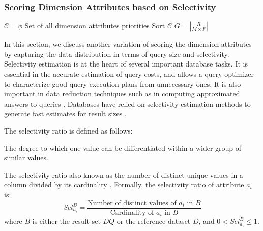 \subsubsection{Scoring Dimension Attributes based on Selectivity}
\label{sec:sela}
%
\begin{algorithm}[t]                      
\caption{$Sela$}          
\label{alg:sela}                           
$\mathcal{C} = \phi$ Set of all dimension attributes priorities \;
	 Sort $\mathcal{C}$\;
	$G= |\frac{R}{M \times F}|$ \;
		\;
\end{algorithm}
%
In this section, we discuss another variation of scoring the dimension attributes by capturing the data distribution in 
terms of query size and selectivity.
%
Selectivity estimation is at the heart of several important database tasks. 
%
It is essential in the accurate estimation of query costs, and allows a query optimizer to characterize good query execution plans from unnecessary ones. 
%
It is also important in data reduction techniques such as in computing approximated answers to queries \cite{DBLP:journals/debu/BarbaraDFHHIJJNPRS97,DBLP:conf/pods/GilbertKMS01}. 
%
Databases have relied on selectivity estimation methods to generate fast estimates for result sizes \cite{DBLP:conf/sigmod/ChaudhuriMN98,DBLP:conf/pods/CharikarCMN00,DBLP:journals/csur/ManninoCS88,DBLP:conf/sigmod/Piatetsky-ShapiroC84}.
%
%

The selectivity ratio \cite{lahdenmaki2005relational} is defined as follows:
\begin{definition}
The degree to which one value can be differentiated within a wider group of similar values.
\end{definition}
%
The selectivity ratio also known as the number of distinct unique 
values in a column divided by its cardinality \cite{DBLP:conf/sigmod/KeyHPA12}.
%
Formally, the selectivity ratio of attribute $a_i$ is:
%
\begin{equation}
\label{eq:selec_ratio}
Sel_{a_i}^{B} = \frac{ \text{Number of distinct values of $a_i$ in $B$} }{ \text{Cardinality of $a_i$ in $B$} }
\end{equation}
%
where $B$ is either the result set $DQ$ or the reference dataset $D$, and $0 < Sel^{B}_{a_i}  \leq 1$.

